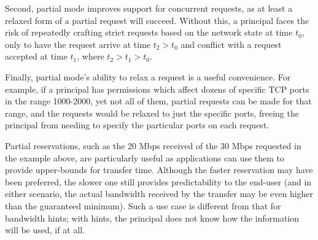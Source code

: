 Second, partial mode improves support
for concurrent requests, as at least a relaxed form of a partial request will succeed.
Without this, a principal faces the risk of repeatedly crafting
strict requests based on the network state at time $t_0$, only to have
the request arrive at time $t_2 > t_0$ and conflict with a request
accepted at time $t_1$, where $t_2 > t_1 > t_0$.

Finally, partial mode's ability to relax a request is a useful convenience.
For example, if a principal has permissions which affect dozens of
specific TCP ports in the range 1000-2000, yet not all of them, partial
requests can be made for that range, and the requests would be relaxed to
just the specific ports, freeing the principal from needing to specify the
particular ports on each request.

Partial reservations, such as the 20 Mbps received of the 30 Mbps requested
in the example above, are particularly useful as
applications can use them to provide upper-bounds for transfer time. Although the
faster reservation may have been preferred, the slower one still provides
predictability to the end-user (and in either scenario, the actual bandwidth
received by the transfer may be even higher than the guaranteed minimum).
Such a use case is different from that for bandwidth hints; with hints, the
principal does not know how the information will be used, if at all.

